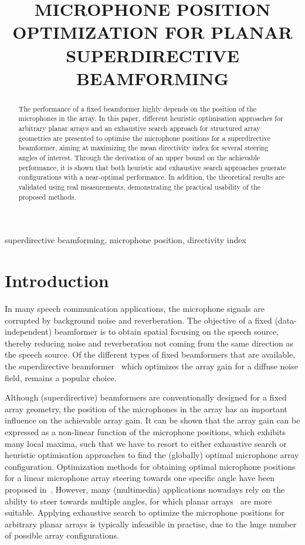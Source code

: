 \documentclass[9pt]{article}
\title{MICROPHONE POSITION OPTIMIZATION FOR PLANAR\\ SUPERDIRECTIVE BEAMFORMING}
\begin{document}
\ninept
%
\maketitle
%
\begin{abstract}
The performance of a fixed beamformer highly depends on the position of the microphones in the array. In this paper, different heuristic optimisation approaches for arbitrary planar arrays and an exhaustive search approach for structured array geometries are presented to optimise the microphone positions for a superdirective beamformer, aiming at maximizing the mean directivity index for several steering angles of interest. Through the derivation of an upper bound on the achievable performance, it is shown that both heuristic and exhaustive search approaches generate configurations with a near-optimal performance. In addition, the theoretical results are validated using real measurements, demonstrating the practical usability of the proposed methods.
\end{abstract}
\begin{keywords}
superdirective beamforming, microphone position, directivity index
\end{keywords}
\vspace{-0.2cm}
\section{Introduction}
\label{sec:intro}
\vspace{-0.2cm}
In many speech communication applications, the microphone signals are corrupted by background noise and reverberation. The objective of a fixed (data-independent) beamformer is to obtain spatial focusing on the speech source, thereby reducing noise and reverberation not coming from the same direction as the speech source. Of the different types of fixed beamformers that are available, the superdirective beamformer~\cite{MAbook2,Elkobook} which optimizes the array gain for a diffuse noise field, remains a popular choice.

Although (superdirective) beamformers are conventionally designed for a fixed array geometry, the position of the microphones in the array has an important influence on the achievable array gain. 
It can be shown that the array gain can be expressed as a non-linear function of the microphone positions, which  exhibits many local maxima, such that we have to resort to either exhaustive search or heuristic optimisation approaches to find the (globally) optimal microphone array configuration. 
Optimization methods for obtaining optimal microphone positions for a linear microphone array steering towards one specific angle have been proposed in~\cite{kajala_broadband_99,ITG,Goodwin_optimization_2005}. However, many (multimedia) applications nowadays rely on the ability to steer towards multiple angles, for which planar arrays~\cite{planar} are more suitable. Applying exhaustive search to optimize the microphone positions for arbitrary planar arrays is typically infeasible in practise, due to the huge number of possible array configurations.
\end{document}
